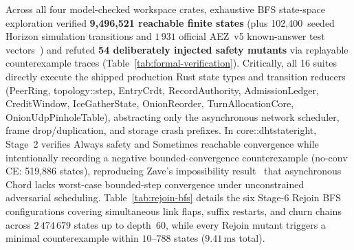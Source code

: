 \documentclass[journal]{IEEEtran}
\DeclareRobustCommand{\code}[1]{{\ttfamily\renewcommand{\_}{\textunderscore\allowbreak}#1}}
\begin{document}
Across all four model-checked workspace crates, exhaustive BFS state-space exploration verified \textbf{9,496,521 reachable finite states} (plus 102,400~seeded Horizon simulation transitions and $1\,931$ official AEZ~v5 known-answer test vectors~\cite{AEZv5}) and refuted \textbf{54 deliberately injected safety mutants} via replayable counterexample traces (Table~\ref{tab:formal-verification}). Critically, all 16 suites directly execute the shipped production Rust state types and transition reducers (\code{PeerRing}, \code{topology::step}, \code{EntryCrdt}, \code{RecordAuthority}, \code{AdmissionLedger}, \code{CreditWindow}, \code{IceGatherState}, \code{OnionReorder}, \code{TurnAllocationCore}, \code{OnionUdpPinholeTable}), abstracting only the asynchronous network scheduler, frame drop/duplication, and storage crash prefixes. In \code{core::dht\_stateright}, Stage~2 verifies \code{Always} safety and \code{Sometimes} reachable convergence while intentionally recording a negative bounded-convergence counterexample (\code{no-conv CE: 519,886 states}), reproducing Zave's impossibility result~\cite{ZaveChordCorrect} that asynchronous Chord lacks worst-case bounded-step convergence under unconstrained adversarial scheduling. Table~\ref{tab:rejoin-bfs} details the six Stage-6 Rejoin BFS configurations covering simultaneous link flaps, suffix restarts, and churn chains across $2\,474\,679$ states up to depth~60, while every Rejoin mutant triggers a minimal counterexample within $10$--$788$ states ($9.41\,\mathrm{ms}$ total).
\end{document}
